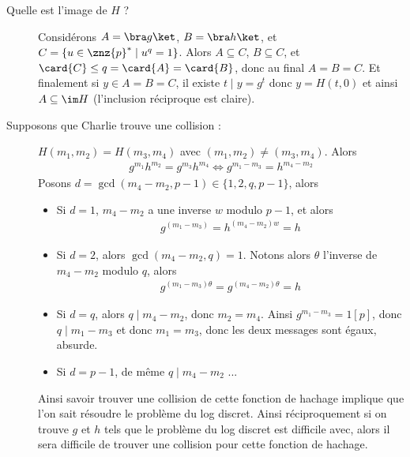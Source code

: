             \begin{description}
                \item[Quelle est l'image de $H$ ?] Considérons $A = \bra g \ket$, $B = \bra h \ket$, et $C = \{u \in \znz{p}^* \mid u^q = 1\}$. Alors $A \subseteq C$, $B \subseteq C$, et $\card{C} \leq q = \card{A} = \card{B}$, donc au final $A = B = C$. Et finalement si $y \in A = B = C$, il existe $t \mid y = g^t$ donc $y = H(t, 0)$ et ainsi $A \subseteq \im H$ (l'inclusion réciproque est claire).
                \item[Supposons que Charlie trouve une collision : ] $H(m_1, m_2) = H(m_3, m_4)$ avec $(m_1, m_2) \neq (m_3, m_4)$. Alors
                \begin{align*}
                    g^{m_1}h^{m_2} = g^{m_3}h^{m_4} \iff g^{m_1 - m_3} = h^{m_4 - m_2}
                \end{align*} 
                Posons $d = \gcd (m_4 - m_2, p - 1) \in \{1, 2, q, p - 1\}$, alors
                \begin{itemize}
                    \item Si $d = 1$, $m_4 - m_2$ a une inverse $w$ modulo $p - 1$, et alors
                    \begin{align*}
                        g^{(m_1 - m_3)} = h^{(m_4 - m_2)w} = h
                    \end{align*}
                    \item Si $d = 2$, alors $\gcd(m_4 - m_2, q) = 1$. Notons alors $\theta$ l'inverse de $m_4 - m_2$ modulo $q$, alors
                    \begin{align*}
                        g^{(m_1 - m_3)\theta} = g^{(m_4 - m_2)\theta} = h
                    \end{align*}
                    \item Si $d = q$, alors $q \mid m_4 - m_2$, donc $m_2 = m_4$. Ainsi $g^{m_1 - m_3} = 1[p]$, donc $q \mid m_1 - m_3$ et donc $m_1 = m_3$, donc les deux messages sont égaux, absurde.
                    \item Si $d = p - 1$, de même $q \mid m_4 - m_2$ ... 
                \end{itemize}
                Ainsi savoir trouver une collision de cette fonction de hachage implique que l'on sait résoudre le problème du log discret. Ainsi réciproquement si on trouve $g$ et $h$ tels que le problème du log discret est difficile avec, alors il sera difficile de trouver une collision pour cette fonction de hachage.
            \end{description}
            
